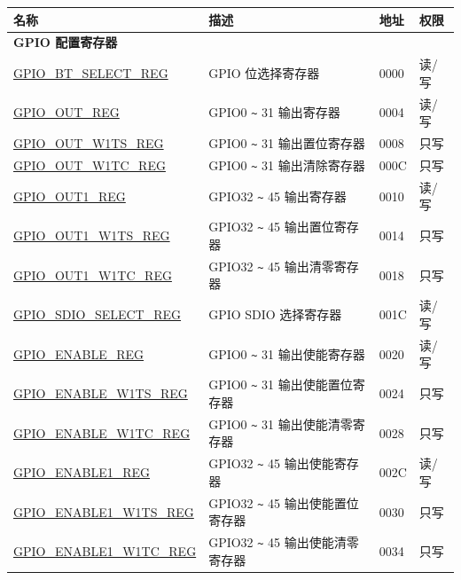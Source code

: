 ﻿\begin{longtable}{ | p{6cm} | p{7.2cm} | p{1.3cm} | p{1cm} | }
\hline\rowcolor{lightgray}
名称 & 描述 & 地址 & 权限 \\ \hline
\endhead
\multicolumn{4}{|l|}{\textbf{GPIO 配置寄存器}} \\ \hline
\hyperref[regdesc:GPIOBTSELECTREG]{GPIO\_BT\_SELECT\_REG} & GPIO 位选择寄存器 & \hexprefix{}0000 & 读/写 \\ \hline
\hyperref[regdesc:GPIOOUTREG]{GPIO\_OUT\_REG} & GPIO0 \verb+~+ 31 输出寄存器 & \hexprefix{}0004 & 读/写 \\ \hline
\hyperref[regdesc:GPIOOUTW1TSREG]{GPIO\_OUT\_W1TS\_REG} & GPIO0 \verb+~+ 31 输出置位寄存器 & \hexprefix{}0008 & 只写 \\ \hline
\hyperref[regdesc:GPIOOUTW1TCREG]{GPIO\_OUT\_W1TC\_REG} & GPIO0 \verb+~+ 31 输出清除寄存器 & \hexprefix{}000C & 只写 \\ \hline
\hyperref[regdesc:GPIOOUT1REG]{GPIO\_OUT1\_REG} & GPIO32 \verb+~+ 45 输出寄存器 & \hexprefix{}0010 & 读/写 \\ \hline
\hyperref[regdesc:GPIOOUT1W1TSREG]{GPIO\_OUT1\_W1TS\_REG} & GPIO32 \verb+~+ 45 输出置位寄存器 & \hexprefix{}0014 & 只写 \\ \hline
\hyperref[regdesc:GPIOOUT1W1TCREG]{GPIO\_OUT1\_W1TC\_REG} & GPIO32 \verb+~+ 45 输出清零寄存器 & \hexprefix{}0018 & 只写 \\ \hline
\hyperref[regdesc:GPIOSDIOSELECTREG]{GPIO\_SDIO\_SELECT\_REG} & GPIO SDIO 选择寄存器 & \hexprefix{}001C & 读/写 \\ \hline
\hyperref[regdesc:GPIOENABLEREG]{GPIO\_ENABLE\_REG} & GPIO0 \verb+~+ 31 输出使能寄存器 & \hexprefix{}0020 & 读/写 \\ \hline
\hyperref[regdesc:GPIOENABLEW1TSREG]{GPIO\_ENABLE\_W1TS\_REG} & GPIO0 \verb+~+ 31 输出使能置位寄存器 & \hexprefix{}0024 & 只写 \\ \hline
\hyperref[regdesc:GPIOENABLEW1TCREG]{GPIO\_ENABLE\_W1TC\_REG} & GPIO0 \verb+~+ 31 输出使能清零寄存器 & \hexprefix{}0028 & 只写 \\ \hline
\hyperref[regdesc:GPIOENABLE1REG]{GPIO\_ENABLE1\_REG} & GPIO32 \verb+~+ 45 输出使能寄存器 & \hexprefix{}002C & 读/写 \\ \hline
\hyperref[regdesc:GPIOENABLE1W1TSREG]{GPIO\_ENABLE1\_W1TS\_REG} & GPIO32 \verb+~+ 45 输出使能置位寄存器 & \hexprefix{}0030 & 只写 \\ \hline
\hyperref[regdesc:GPIOENABLE1W1TCREG]{GPIO\_ENABLE1\_W1TC\_REG} & GPIO32 \verb+~+ 45 输出使能清零寄存器 & \hexprefix{}0034 & 只写 \\ \hline

\end{longtable}
